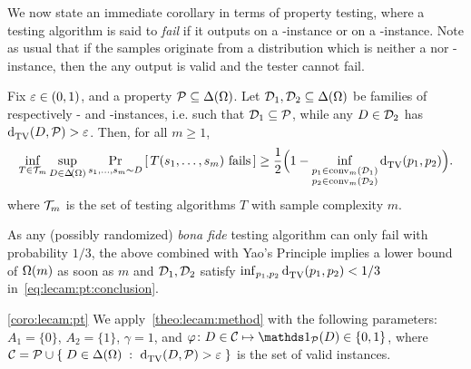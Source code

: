 \documentclass[11pt]{article}
\begin{document}
We now state an immediate corollary in terms of property testing, where a testing algorithm is said to \emph{fail} if it outputs \accept on a \no-instance or \reject on a \yes-instance. Note as usual that if the samples originate from a distribution which is neither a \yes nor \no-instance, then the any output is valid and the tester cannot fail.
\begin{corollary}\label{coro:lecam:pt}
  Fix $\varepsilon\in(0,1)$, and a property $\mathcal{P}\subseteq\Delta\!\left(\Omega\right)$. Let $\mathcal{D}_1,\mathcal{D}_2\subseteq\Delta\!\left(\Omega\right)$ be families of respectively \yes- and \no-instances, i.e. such that $\mathcal{D}_1\subseteq\mathcal{P}$, while any $D\in\mathcal{D}_2$ has ${\operatorname{d}_{\rm TV}^{}\!\left({D, \mathcal{P}}\right)} > \varepsilon$. Then, for all $m\geq 1$,
  \begin{equation}\label{eq:lecam:pt:conclusion}
    \inf_{T\in \mathcal{T}_m} \sup_{D\in\Delta\!\left(\Omega\right) } \Pr_{s_1,\dots,s_m\sim D}\left[\, T(s_1,\dots,s_m) \text{ fails}\, \right]
    \geq \frac{1}{2}\Big(1-\inf_{\substack{ p_1 \in \operatorname{conv}_m(\mathcal{D}_1) \\ p_2 \in \operatorname{conv}_m(\mathcal{D}_2) }} {\operatorname{d}_{\rm TV}^{}\!\left({p_1, p_2}\right)}\Big).
  \end{equation}
  where $\mathcal{T}_m$ is the set of  testing algorithms $T$ with sample complexity $m$.
\end{corollary}
\noindent As any (possibly randomized) \textit{bona fide} testing algorithm can only fail with probability $1/3$, the above combined with Yao's Principle implies a lower bound of $\bigOmega{m}$ as soon as $m$ and $\mathcal{D}_1,\mathcal{D}_2$ satisfy
$
\inf_{p_1,p_2} {\operatorname{d}_{\rm TV}^{}\!\left({p_1, p_2}\right)} < 1/3
$
in~\eqref{eq:lecam:pt:conclusion}.
\begin{proofof}{\autoref{coro:lecam:pt}}
We apply~\autoref{theo:lecam:method} with the following parameters: $A_1=\{0\}$, $A_2=\{1\}$, $\gamma=1$, and $\varphi\colon\D\in \class\mapsto \indicSet{\property}(\D)\in\{0,1\}$, where $\mathcal{C}=\mathcal{P}\cup\left\{\;  D\in\Delta\!\left(\Omega\right)  \;\colon\;  {\operatorname{d}_{\rm TV}^{}\!\left({D, \mathcal{P}}\right)} > \varepsilon \; \right\}$ is the set of valid instances.
\end{proofof}
\end{document}
